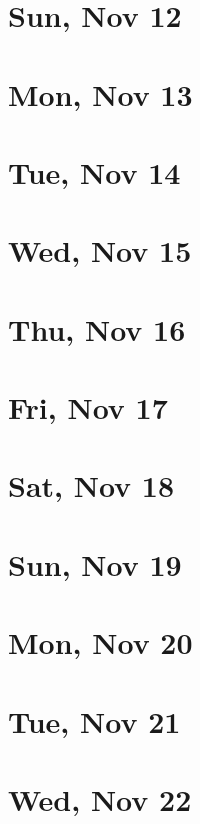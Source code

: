 	\section{Sun, Nov 12}
		
	\section{Mon, Nov 13}
		
	\section{Tue, Nov 14}
		
	\section{Wed, Nov 15}
		
	\section{Thu, Nov 16}
		
	\section{Fri, Nov 17}
		
	\section{Sat, Nov 18}
		
	\section{Sun, Nov 19}
		
	\section{Mon, Nov 20}
		
	\section{Tue, Nov 21}
		
	\section{Wed, Nov 22}
		
